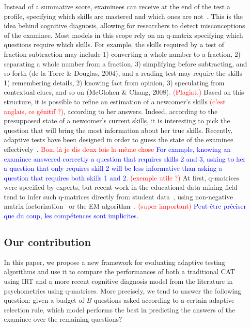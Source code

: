 \documentclass{sig-alternate}
\newcommand\alert[1]{\textcolor{red}{#1}}
\newcommand\note[1]{\textcolor{blue}{#1}}
\begin{document}
Instead of a summative score, examinees can receive at the end of the test a profile, specifying which skills are mastered and which ones are not~\cite{Cheng2009}. This is the idea behind cognitive diagnosis, allowing for researchers to detect misconceptions of the examinee. Most models in this scope rely on an q-matrix specifying which questions require which skills. For example, the skills required by a test of fraction subtraction may include 1) converting a whole number to a fraction, 2) separating a whole number from a fraction, 3) simplifying before subtracting, and so forth (de la Torre \& Douglas, 2004), and a reading test may require the skills 1) remembering details, 2) knowing fact from opinion, 3) speculating from contextual clues, and so on (McGlohen \& Chang, 2008). \alert{(Plagiat.)} Based on this structure, it is possible to refine an estimation of a newcomer's skills \alert{(c'est anglais, ce génitif ?)}, according to her answers. Indeed, according to the presupposed state of a newcomer's current skills, it is interesting to pick the question that will bring the most information about her true skills. Recently, adaptive tests have been designed in order to guess the state of the examinee effectively~\cite{Huebner2010}. \alert{Bon, là je dis deux fois la même chose} \note{For example, knowing an examinee answered correctly a question that requires skills 2 and 3, asking to her a question that only requires skill 2 will be less informative than asking a question that requires both skills 1 and 2.} \alert{(exemple utile ?)} At first, q-matrices were specified by experts, but recent work in the educational data mining field tend to infer such q-matrices directly from student data~\cite{Barnes2005}, using non-negative matrix factorization~\cite{Desmarais2011} or the EM algorithm~\cite{Huebner2010}. \alert{(super important)} \note{Peut-être préciser que du coup, les compétences sont implicites.}

\subsection{Our contribution}

In this paper, we propose a new framework for evaluating adaptive testing algorithms and use it to compare the performances of both a traditional CAT using IRT and a more recent cognitive diagnosis model from the literature in psychometrics using q-matrices. More precisely, we tend to answer the following question: given a budget of $B$ questions asked according to a certain adaptive selection rule, which model performs the best in predicting the answers of the examinee over the remaining questions?
\end{document}
